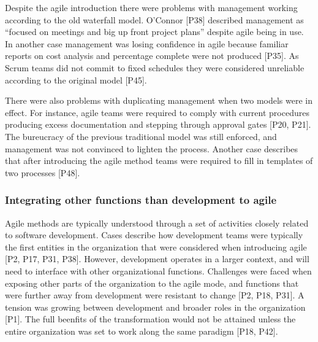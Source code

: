 \documentclass[preprint,authoryear,12pt]{elsarticle}
\begin{document}
Despite the agile introduction there were problems with management working
according to the old waterfall model. O'Connor [P38] described management as
``focused on meetings and big up front project plans'' despite agile being in
use. In another case management was losing confidence in agile because familiar
reports on cost analysis and percentage complete were not produced [P35]. As
Scrum teams did not commit to fixed schedules they were considered unreliable
according to the original model [P45].

There were also problems with duplicating management when two models were in
effect. For instance, agile teams were required to comply with current
procedures producing excess documentation and stepping through approval gates
[P20, P21]. The bureucracy of the previous traditional model was still enforced,
and management was not convinced to lighten the process. Another case describes
that after introducing the agile method teams were required to fill in templates
of two processes [P48].





\subsubsection{Integrating other functions than development to agile}


Agile methods are typically understood through a set of activities closely
related to software development. Cases describe how development teams were
typically the first entities in the organization that were considered when
introducing agile [P2, P17, P31, P38]. However, development operates in a larger
context, and will need to interface with other organizational functions.
Challenges were faced when exposing other parts of the organization to the agile
mode, and functions that were further away from development were resistant to
change [P2, P18, P31]. A tension was growing between development and broader
roles in the organization [P1]. The full beenfits of the transformation would
not be attained unless the entire organization was set to work along the same
paradigm [P18, P42].
\end{document}
